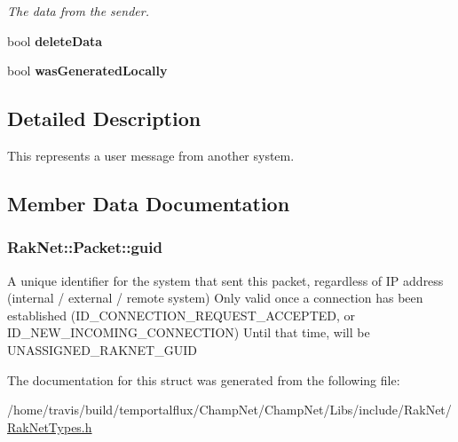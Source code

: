 \begin{DoxyCompactItemize}
\begin{DoxyCompactList}\small\item\em The data from the sender. \end{DoxyCompactList}\item 
\hypertarget{struct_rak_net_1_1_packet_af6ed736852a1d11a18adeba64f343f21}{bool {\bfseries delete\-Data}}\label{struct_rak_net_1_1_packet_af6ed736852a1d11a18adeba64f343f21}

\item 
\hypertarget{struct_rak_net_1_1_packet_a5853b492691a56b4f720fa5b2b6af752}{bool {\bfseries was\-Generated\-Locally}}\label{struct_rak_net_1_1_packet_a5853b492691a56b4f720fa5b2b6af752}

\end{DoxyCompactItemize}


\subsection{Detailed Description}
This represents a user message from another system. 

\subsection{Member Data Documentation}
\hypertarget{struct_rak_net_1_1_packet_ac6df86ad7879c10dc1ac0624d5c7b329}{
\subsubsection[{guid}]{ Rak\-Net\-::\-Packet\-::guid}}\label{struct_rak_net_1_1_packet_ac6df86ad7879c10dc1ac0624d5c7b329}
A unique identifier for the system that sent this packet, regardless of I\-P address (internal / external / remote system) Only valid once a connection has been established (I\-D\-\_\-\-C\-O\-N\-N\-E\-C\-T\-I\-O\-N\-\_\-\-R\-E\-Q\-U\-E\-S\-T\-\_\-\-A\-C\-C\-E\-P\-T\-E\-D, or I\-D\-\_\-\-N\-E\-W\-\_\-\-I\-N\-C\-O\-M\-I\-N\-G\-\_\-\-C\-O\-N\-N\-E\-C\-T\-I\-O\-N) Until that time, will be U\-N\-A\-S\-S\-I\-G\-N\-E\-D\-\_\-\-R\-A\-K\-N\-E\-T\-\_\-\-G\-U\-I\-D 

The documentation for this struct was generated from the following file\-:\begin{DoxyCompactItemize}
\item 
/home/travis/build/temportalflux/\-Champ\-Net/\-Champ\-Net/\-Libs/include/\-Rak\-Net/\hyperlink{_rak_net_types_8h}{Rak\-Net\-Types.\-h}\end{DoxyCompactItemize}

